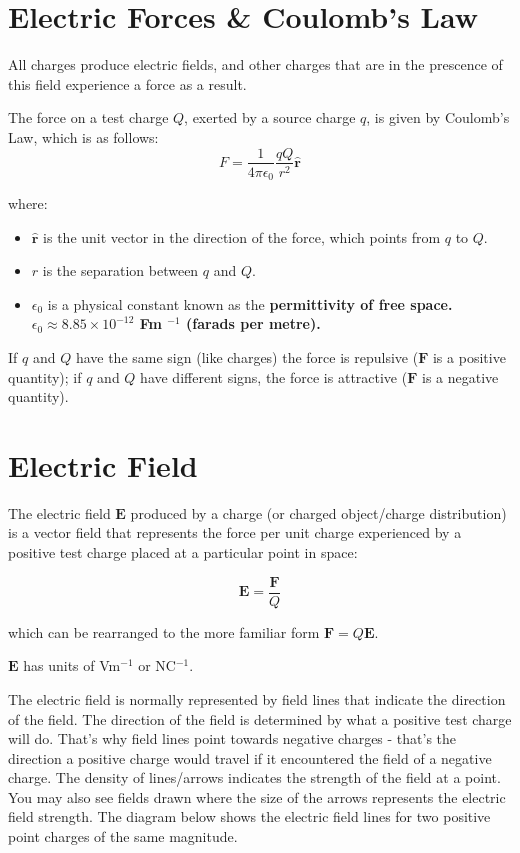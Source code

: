 \documentclass[
  letterpaper,
  DIV=11,
  numbers=noendperiod]{scrreprt}
\providecommand{\tightlist}{%
  \setlength{\itemsep}{0pt}\setlength{\parskip}{0pt}}\usepackage{longtable,booktabs,array}
\begin{document}
\section{Electric Forces \& Coulomb's
Law}\label{electric-forces-coulombs-law}

All charges produce electric fields, and other charges that are in the
prescence of this field experience a force as a result.

The force on a test charge \(Q\), exerted by a source charge \(q\), is
given by Coulomb's Law, which is as follows:
\[ F = \frac{1}{4\pi \epsilon_0} \frac{q Q}{r^2} \hat{\mathrm{\mathbf{r}}} \]

where:

\begin{itemize}
\tightlist
\item
  \(\hat{\mathrm{\mathbf{r}}}\) is the unit vector in the direction of
  the force, which points from \(q\) to \(Q\).
\item
  \(r\) is the separation between \(q\) and \(Q\).
\item
  \(\epsilon_0\) is a physical constant known as the
  \bf{permittivity of free space}.  $\epsilon_0 \approx 8.85 \times 10^{-12}$ Fm $^{-1}$ (farads per metre). 
\end{itemize}

If \(q\) and \(Q\) have the same sign (like charges) the force is
repulsive (\(\mathrm{\mathbf{F}}\) is a positive quantity); if \(q\) and
\(Q\) have different signs, the force is attractive
(\(\mathrm{\mathbf{F}}\) is a negative quantity).

\section{Electric Field}\label{electric-field}

The electric field \(\mathrm{\mathbf{E}}\) produced by a charge (or
charged object/charge distribution) is a vector field that represents
the force per unit charge experienced by a positive test charge placed
at a particular point in space:

\[ \mathrm{\mathbf{E}}= \frac{\mathrm{\mathbf{F}}}{Q} \]

\noindent which can be rearranged to the more familiar form
\(\mathrm{\mathbf{F}}= Q \mathrm{\mathbf{E}}\).

\(\mathbf{E}\) has units of Vm\(^{-1}\) or NC\(^{-1}\).

The electric field is normally represented by field lines that indicate
the direction of the field. The direction of the field is determined by
what a positive test charge will do. That's why field lines point
towards negative charges - that's the direction a positive charge would
travel if it encountered the field of a negative charge. The density of
lines/arrows indicates the strength of the field at a point. You may
also see fields drawn where the size of the arrows represents the
electric field strength. The diagram below shows the electric field
lines for two positive point charges of the same magnitude.
\end{document}

